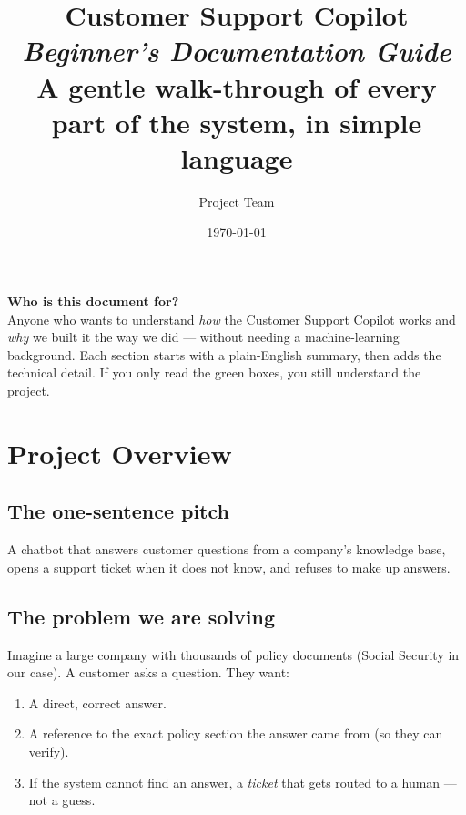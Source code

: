 \documentclass[11pt,a4paper]{article}
\title{\vspace{-1.5cm}\Huge\textbf{Customer Support Copilot}\\[8pt]
       \Large\textit{Beginner's Documentation Guide}\\[4pt]
       \normalsize A gentle walk-through of every part of the system, in simple language}
\author{Project Team}
\date{\today}
\begin{document}
\maketitle

\vspace{-20pt}
\begin{center}
\colorbox{soft}{\parbox{0.9\textwidth}{\small
\textbf{Who is this document for?}\\[2pt]
Anyone who wants to understand \emph{how} the Customer Support Copilot works and \emph{why} we built it the way we did --- without needing a machine-learning background. Each section starts with a plain-English summary, then adds the technical detail. If you only read the green boxes, you still understand the project.
}}
\end{center}

\tableofcontents
\clearpage

\section{Project Overview}

\subsection{The one-sentence pitch}

\begin{keyidea}
A chatbot that answers customer questions from a company's knowledge base, opens a support ticket when it does not know, and refuses to make up answers.
\end{keyidea}

\subsection{The problem we are solving}

Imagine a large company with thousands of policy documents (Social Security in our case). A customer asks a question. They want:

\begin{enumerate}[leftmargin=*, itemsep=2pt]
\item A direct, correct answer.
\item A reference to the exact policy section the answer came from (so they can verify).
\item If the system cannot find an answer, a \emph{ticket} that gets routed to a human --- not a guess.
\end{enumerate}
\end{document}
